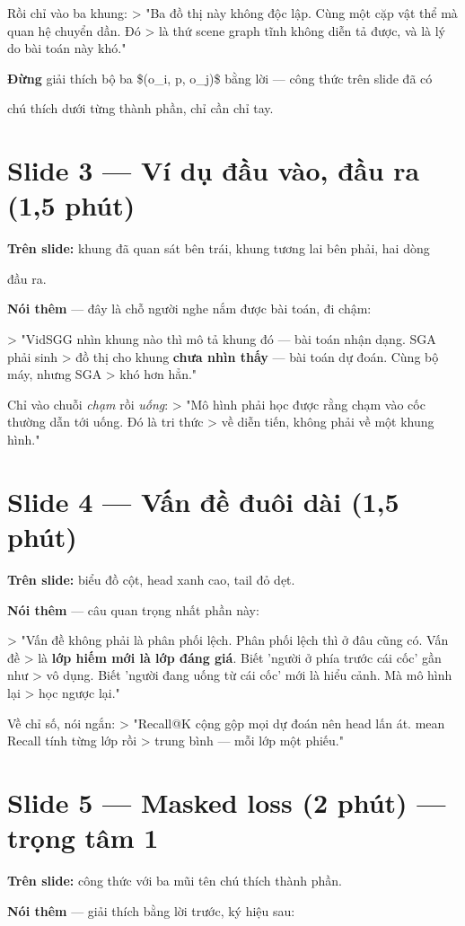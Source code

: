 \documentclass[11pt,a4paper]{article}
\begin{document}
Rồi chỉ vào ba khung: > "Ba đồ thị này không độc lập. Cùng một cặp vật thể mà quan hệ chuyển dần. Đó > là thứ scene graph tĩnh không diễn tả được, và là lý do bài toán này khó."

\textbf{Đừng} giải thích bộ ba \$(o\_i, p, o\_j)\$ bằng lời --- công thức trên slide đã có

chú thích dưới từng thành phần, chỉ cần chỉ tay.

\section{Slide 3 --- Ví dụ đầu vào, đầu ra (1,5 phút)}
\textbf{Trên slide:} khung đã quan sát bên trái, khung tương lai bên phải, hai dòng

đầu ra.

\textbf{Nói thêm} --- đây là chỗ người nghe nắm được bài toán, đi chậm:

> "VidSGG nhìn khung nào thì mô tả khung đó --- bài toán nhận dạng. SGA phải sinh > đồ thị cho khung \textbf{chưa nhìn thấy} --- bài toán dự đoán. Cùng bộ máy, nhưng SGA > khó hơn hẳn."

Chỉ vào chuỗi \emph{chạm} rồi \emph{uống}: > "Mô hình phải học được rằng chạm vào cốc thường dẫn tới uống. Đó là tri thức > về diễn tiến, không phải về một khung hình."

\section{Slide 4 --- Vấn đề đuôi dài (1,5 phút)}
\textbf{Trên slide:} biểu đồ cột, head xanh cao, tail đỏ dẹt.

\textbf{Nói thêm} --- câu quan trọng nhất phần này:

> "Vấn đề không phải là phân phối lệch. Phân phối lệch thì ở đâu cũng có. Vấn đề > là \textbf{lớp hiếm mới là lớp đáng giá}. Biết 'người ở phía trước cái cốc' gần như > vô dụng. Biết 'người đang uống từ cái cốc' mới là hiểu cảnh. Mà mô hình lại > học ngược lại."

Về chỉ số, nói ngắn: > "Recall@K cộng gộp mọi dự đoán nên head lấn át. mean Recall tính từng lớp rồi > trung bình --- mỗi lớp một phiếu."

\section{Slide 5 --- Masked loss (2 phút) --- trọng tâm 1}
\textbf{Trên slide:} công thức với ba mũi tên chú thích thành phần.

\textbf{Nói thêm} --- giải thích bằng lời trước, ký hiệu sau:
\end{document}
